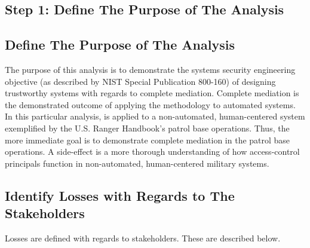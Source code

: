 \documentclass[../../main/main.tex]{subfiles}
\begin{document}
\subsection{Step 1: Define The Purpose of The Analysis}
\subsection{Define The Purpose of The Analysis}
The purpose of this analysis is to demonstrate the systems security engineering objective (as described by NIST Special Publication 800-160) of designing trustworthy systems with regards to complete mediation.  Complete mediation is the demonstrated outcome of applying the  methodology to automated systems.  In this particular analysis,  is applied to a non-automated, human-centered system exemplified by the U.S. Ranger Handbook's patrol base operations.  Thus, the more immediate goal is to demonstrate complete mediation in the patrol base operations.  A side-effect is a more thorough understanding of how access-control principals function in non-automated, human-centered military systems.  

\subsection{Identify Losses  with Regards to The Stakeholders}
Losses are defined with regards to stakeholders.  These are described below.
\end{document}
